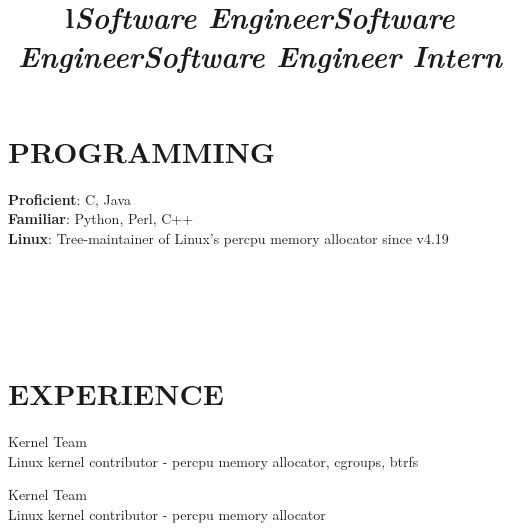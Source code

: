 \documentclass[margin,11pt]{res}
\begin{document}
\begin{resume}
\section{PROGRAMMING}

\textbf{Proficient}: C, Java\\
\textbf{Familiar}: Python, Perl, C++\\
\textbf{Linux}: Tree-maintainer of Linux's percpu memory allocator since v4.19

\begin{format}
\\
\title{l}\\
\body\\
\end{format}

\section{EXPERIENCE}
\title{\sl{Software Engineer}}
\begin{position}
\end{position}

\title{\sl{Software Engineer}}
\begin{position}
Kernel Team\\
Linux kernel contributor - percpu memory allocator, cgroups, btrfs
\end{position}

\title{\sl{Software Engineer Intern}}
\begin{position}
Kernel Team\\
Linux kernel contributor - percpu memory allocator
\end{position}


\end{resume}
\end{document}
